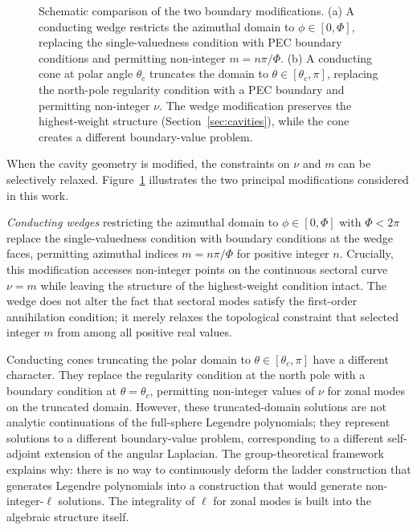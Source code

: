 \documentclass[
  aip,
  amsmath,amssymb,
  preprint
]{revtex4-1}
\begin{document}
\begin{figure}[htbp]
\caption{Schematic comparison of the two boundary modifications. (a) A conducting wedge restricts the azimuthal domain to $\phi \in [0, \Phi]$, replacing the single-valuedness condition with PEC boundary conditions and permitting non-integer $m = n\pi/\Phi$. (b) A conducting cone at polar angle $\theta_c$ truncates the domain to $\theta \in [\theta_c, \pi]$, replacing the north-pole regularity condition with a PEC boundary and permitting non-integer $\nu$. The wedge modification preserves the highest-weight structure (Section~\ref{sec:cavities}), while the cone creates a different boundary-value problem.}
\label{fig:geometry_comparison}
\end{figure}

When the cavity geometry is modified, the constraints on $\nu$ and $m$ can be selectively relaxed. Figure~\ref{fig:geometry_comparison} illustrates the two principal modifications considered in this work.

\noindent \textit{Conducting wedges} restricting the azimuthal domain to $\phi \in [0, \Phi]$ with $\Phi < 2\pi$ replace the single-valuedness condition with boundary conditions at the wedge faces, permitting azimuthal indices $m = n\pi/\Phi$ for positive integer $n$. Crucially, this modification accesses non-integer points on the continuous sectoral curve $\nu = m$ while leaving the structure of the highest-weight condition intact. The wedge does not alter the fact that sectoral modes satisfy the first-order annihilation condition; it merely relaxes the topological constraint that selected integer $m$ from among all positive real values.

Conducting cones truncating the polar domain to $\theta \in [\theta_c, \pi]$ 
have a different character. They replace the regularity condition at the north pole with a boundary condition at $\theta = \theta_c$, permitting non-integer values of $\nu$ for zonal modes on the truncated domain. However, these truncated-domain solutions are not analytic continuations of the full-sphere Legendre polynomials; they represent solutions to a different boundary-value problem, corresponding to a different self-adjoint extension of the angular Laplacian. The group-theoretical framework explains why: there is no way to continuously deform the ladder construction that generates Legendre polynomials into a construction that would generate non-integer-$\ell$ solutions. The integrality of $\ell$ for zonal modes is built into the algebraic structure itself.
\end{document}
